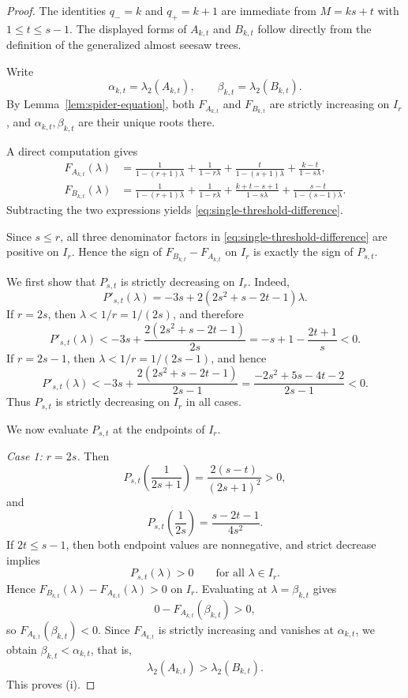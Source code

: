 \documentclass[10pt,a4paper]{amsart}
\begin{document}
\begin{proof}
The identities $q_-=k$ and $q_+=k+1$ are immediate from $M=ks+t$ with $1\le t\le s-1$.
The displayed forms of $A_{k,t}$ and $B_{k,t}$ follow directly from the definition of the generalized almost seesaw trees.

Write
$$
\alpha_{k,t}=\lambda_2(A_{k,t}),
\qquad
\beta_{k,t}=\lambda_2(B_{k,t}).
$$
By Lemma~\ref{lem:spider-equation}, both $F_{A_{k,t}}$ and $F_{B_{k,t}}$ are strictly increasing on $I_r$, and $\alpha_{k,t},\beta_{k,t}$ are their unique roots there.

A direct computation gives
\begin{align*}
F_{A_{k,t}}(\lambda)
&=
\frac{1}{1-(r+1)\lambda}
+\frac{1}{1-r\lambda}
+\frac{t}{1-(s+1)\lambda}
+\frac{k-t}{1-s\lambda},\\
F_{B_{k,t}}(\lambda)
&=
\frac{1}{1-(r+1)\lambda}
+\frac{1}{1-r\lambda}
+\frac{k+t-s+1}{1-s\lambda}
+\frac{s-t}{1-(s-1)\lambda}.
\end{align*}
Subtracting the two expressions yields \eqref{eq:single-threshold-difference}.

Since $s\le r$, all three denominator factors in \eqref{eq:single-threshold-difference} are positive on $I_r$.
Hence the sign of $F_{B_{k,t}}-F_{A_{k,t}}$ on $I_r$ is exactly the sign of $P_{s,t}$.

We first show that $P_{s,t}$ is strictly decreasing on $I_r$.
Indeed,
$$
P'_{s,t}(\lambda)=-3s+2(2s^2+s-2t-1)\lambda.
$$
If $r=2s$, then $\lambda<1/r=1/(2s)$, and therefore
$$
P'_{s,t}(\lambda)
<
-3s+\frac{2(2s^2+s-2t-1)}{2s}
=
-s+1-\frac{2t+1}{s}
<0.
$$
If $r=2s-1$, then $\lambda<1/r=1/(2s-1)$, and hence
$$
P'_{s,t}(\lambda)
<
-3s+\frac{2(2s^2+s-2t-1)}{2s-1}
=
\frac{-2s^2+5s-4t-2}{2s-1}
<0.
$$
Thus $P_{s,t}$ is strictly decreasing on $I_r$ in all cases.

We now evaluate $P_{s,t}$ at the endpoints of $I_r$.

\medskip
\noindent
{\it Case 1: $r=2s$.}
Then
$$
P_{s,t}\!\left(\frac1{2s+1}\right)=\frac{2(s-t)}{(2s+1)^2}>0,
$$
and
$$
P_{s,t}\!\left(\frac1{2s}\right)=\frac{s-2t-1}{4s^2}.
$$
If $2t\le s-1$, then both endpoint values are nonnegative, and strict decrease implies
$$
P_{s,t}(\lambda)>0\qquad \text{for all }\lambda\in I_r.
$$
Hence $F_{B_{k,t}}(\lambda)-F_{A_{k,t}}(\lambda)>0$ on $I_r$.
Evaluating at $\lambda=\beta_{k,t}$ gives
$$
0-F_{A_{k,t}}(\beta_{k,t})>0,
$$
so $F_{A_{k,t}}(\beta_{k,t})<0$.
Since $F_{A_{k,t}}$ is strictly increasing and vanishes at $\alpha_{k,t}$, we obtain $\beta_{k,t}<\alpha_{k,t}$, that is,
$$
\lambda_2(A_{k,t})>\lambda_2(B_{k,t}).
$$
This proves \textnormal{(i)}.


\end{proof}
\end{document}
